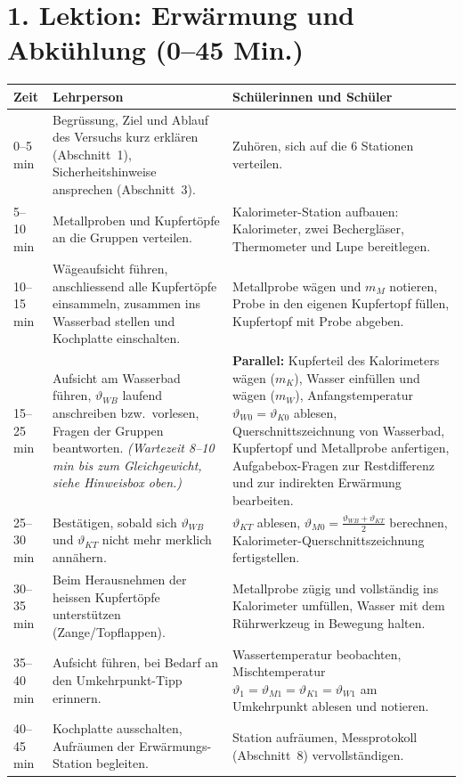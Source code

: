 \documentclass[11pt,a4paper]{article}
\newcommand{\vtheta}{\vartheta}
\begin{document}
\section{1. Lektion: Erw\"armung und Abk\"uhlung (0--45 Min.)}
\renewcommand{\arraystretch}{1.3}
\begin{tabularx}{\linewidth}{@{}p{2.0cm} X X@{}}
  \toprule
  \textbf{Zeit} & \textbf{Lehrperson} & \textbf{Sch\"ulerinnen und Sch\"uler} \\
  \midrule
  0--5\,min &
    Begr\"ussung, Ziel und Ablauf des Versuchs kurz erkl\"aren (Abschnitt~1), Sicherheitshinweise ansprechen (Abschnitt~3). &
    Zuh\"oren, sich auf die 6 Stationen verteilen. \\
  5--10\,min &
    Metallproben und Kupfert\"opfe an die Gruppen verteilen. &
    Kalorimeter-Station aufbauen: Kalorimeter, zwei Bechergl\"aser, Thermometer und Lupe bereitlegen. \\
  10--15\,min &
    W\"ageaufsicht f\"uhren, anschliessend alle Kupfert\"opfe einsammeln, zusammen ins Wasserbad stellen und Kochplatte einschalten. &
    Metallprobe w\"agen und $m_M$ notieren, Probe in den eigenen Kupfertopf f\"ullen, Kupfertopf mit Probe abgeben. \\
  \rowcolor{warnbg}
  15--25\,min &
    Aufsicht am Wasserbad f\"uhren, $\vtheta_{WB}$ laufend anschreiben bzw.\ vorlesen, Fragen der Gruppen beantworten. \newline\textit{(Wartezeit 8--10\,min bis zum Gleichgewicht, siehe Hinweisbox oben.)} &
    \textbf{Parallel:} Kupferteil des Kalorimeters w\"agen ($m_K$), Wasser einf\"ullen und w\"agen ($m_W$), Anfangstemperatur $\vtheta_{W0}=\vtheta_{K0}$ ablesen, Querschnittszeichnung von Wasserbad, Kupfertopf und Metallprobe anfertigen, Aufgabebox-Fragen zur Restdifferenz und zur indirekten Erw\"armung bearbeiten. \\
  25--30\,min &
    Best\"atigen, sobald sich $\vtheta_{WB}$ und $\vtheta_{KT}$ nicht mehr merklich ann\"ahern. &
    $\vtheta_{KT}$ ablesen, $\vtheta_{M0}=\tfrac{\vtheta_{WB}+\vtheta_{KT}}{2}$ berechnen, Kalorimeter-Querschnittszeichnung fertigstellen. \\
  30--35\,min &
    Beim Herausnehmen der heissen Kupfert\"opfe unterst\"utzen (Zange/Topflappen). &
    Metallprobe z\"ugig und vollst\"andig ins Kalorimeter umf\"ullen, Wasser mit dem R\"uhrwerkzeug in Bewegung halten. \\
  35--40\,min &
    Aufsicht f\"uhren, bei Bedarf an den Umkehrpunkt-Tipp erinnern. &
    Wassertemperatur beobachten, Mischtemperatur $\vtheta_1=\vtheta_{M1}=\vtheta_{K1}=\vtheta_{W1}$ am Umkehrpunkt ablesen und notieren. \\
  40--45\,min &
    Kochplatte ausschalten, Aufr\"aumen der Erw\"armungs-Station begleiten. &
    Station aufr\"aumen, Messprotokoll (Abschnitt~8) vervollst\"andigen. \\
  \bottomrule
\end{tabularx}
\end{document}
